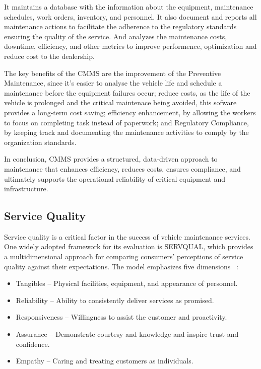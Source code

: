 It maintains a database with the information about the equipment, maintenance schedules, work orders, inventory, and personnel. 
It also document and reports all maintenance actions to facilitate the adherence to the regulatory standards ensuring the quality of the service. 
And analyzes the maintenance costs, downtime, efficiency, and other metrics to improve performence, optimization and reduce cost to the dealership.

The key benefits of the \ac{CMMS} are the improvement of the Preventive Maintenance, since it's easier to analyse the vehicle life and schedule a maintenance before the equipment failures occur; reduce costs, as the life of the vehicle is prolonged and the critical maintenace being avoided, this sofware provides a long-term cost saving; efficiency enhancement, by allowing the workers to focus on completing task instead of paperwork; and Regulatory Compliance, by keeping track and documenting the maintenance activities to comply by the organization standards. 

In conclusion, \ac{CMMS} provides a structured, data-driven approach to maintenance that enhances efficiency, reduces costs, ensures compliance, and ultimately supports the operational reliability of critical equipment and infrastructure.





\subsection{Service Quality}

Service quality is a critical factor in the success of vehicle maintenance services. One widely adopted framework for its evaluation is SERVQUAL, which provides a multidimensional approach for comparing consumers' perceptions of service quality against their expectations. The model emphasizes five dimensions ~\cite{SERVQUAL_OLD}:


\begin{itemize}
   \item Tangibles – Physical facilities, equipment, and appearance of personnel.
   \item Reliability – Ability to consistently deliver services as promised.
   \item Responsiveness – Willingness to assist the customer and proactivity.
   \item Assurance – Demonstrate courtesy and knowledge and inspire trust and confidence.
   \item Empathy – Caring and treating customers as individuals.
  \end{itemize}

